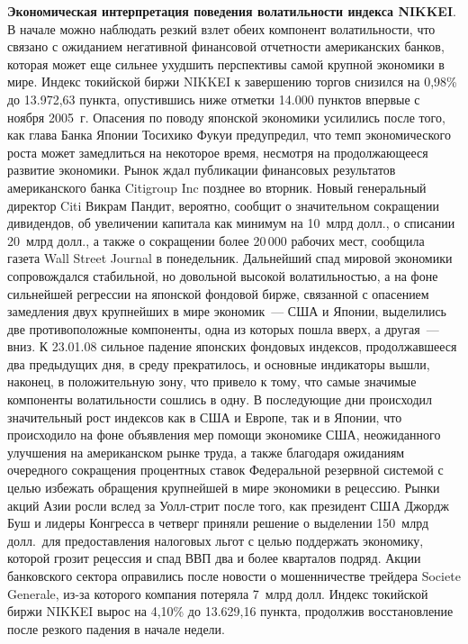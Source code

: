 \begin{multicols}{2}
{\bf Экономическая интерпретация поведения волатильности индекса
NIKKEI}. В начале можно наблюдать резкий взлет обеих компонент
волатильности, что связано с ожиданием негативной финансовой
отчетности американских банков, которая может еще сильнее ухудшить
перспективы самой крупной экономики в мире. Индекс токийской биржи
NIKKEI к завершению торгов снизился на 0,98\% до 13.972,63 пункта,
опустившись ниже отметки 14.000 пунктов впервые с ноября 2005~г.
Опасения по поводу японской экономики усилились после того,
как глава Банка Японии Тосихико Фукуи предупредил, что темп
экономического роста может замедлиться на некоторое время,
несмотря на продолжающееся развитие экономики. Рынок ждал
публикации финансовых результатов американского банка Citigroup
Inc позднее во вторник. Новый генеральный директор Citi Викрам
Пандит, вероятно, сообщит о значительном сокращении дивидендов, об
увеличении капитала как минимум на 10~млрд долл., о списании
20~млрд долл., а также о сокращении более 20\,000 рабочих
мест, сообщила газета Wall Street Journal в понедельник.
Дальнейший спад мировой экономики со\-про\-вож\-дал\-ся стабильной, но
довольной высокой волатильностью, а на фоне сильнейшей регрессии
на японской фондовой бирже, связанной с опасением замедления двух
крупнейших в мире экономик~--- США и Японии, выделились две
противоположные компоненты, одна из которых пошла вверх, а другая~---
вниз. К 23.01.08 сильное падение японских фондовых индексов,
продолжавшееся два предыду\-щих дня, в среду прекратилось, и
основные индикаторы вышли, наконец, в положительную зону, что
привело к тому, что самые значимые компоненты волатильности
сошлись в одну. В последующие дни происходил значительный рост
индексов как в США и Европе, так и в Японии, что происходило на
фоне объявления мер помощи экономике США, неожиданного улучшения
на американском рынке труда, а также благодаря ожиданиям
очередного сокращения процентных ставок Федеральной резервной
системой с целью избежать обращения крупнейшей в мире экономики в
рецессию. Рынки акций Азии росли вслед за Уолл-стрит после того,
как президент США Джордж Буш и лидеры Конгресса в четверг приняли
решение о выделении 150~млрд долл.\ для предоставления
налоговых льгот с целью поддержать экономику, которой грозит
рецессия и спад ВВП два и более кварталов подряд. Акции
банковского сектора оправились после новости о мошенничестве
трейдера Societe Generale, из-за которого компания потеряла 7~млрд
долл. Индекс токийской биржи NIKKEI вырос на 4,10\% до
13.629,16 пункта, продолжив вос\-ста\-нов\-ле\-ние после резкого падения в
начале недели.


\end{multicols}

